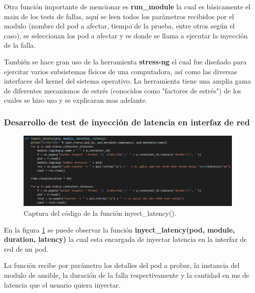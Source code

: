 \par Otra función importante de mencionar es \textbf{run\_module} la cual es básicamente el main de los tests de fallas, aquí se leen todos los parámetros recibidos por el modulo (nombre del pod a afectar, tiempo de la prueba, entre otros según el caso), se seleccionan los pod a afectar y es donde se llama a ejecutar la inyección de la falla.\\

\par También se hace gran uso de la herramienta \textbf{stress-ng} 
el cual fue diseñado para ejercitar varios subsistemas físicos de una computadora, así como las diversas interfaces del kernel del sistema operativo. La herramienta tiene una amplia gama de diferentes mecanismos de estrés (conocidos como "factores de estrés") de los cuales se hizo uso y se explicaran mas adelante.\\

\subsubsection{Desarrollo de test de inyección de latencia en interfaz de red}

\begin{figure}[htpb!]
	\centering
	\includegraphics[width=0.95\columnwidth]{images/captures/codigo/Capture_inyect_latency.PNG}
	\caption{Captura del código de la función inyect\_latency().}
	\label{fig:codi02}
\end{figure}

\par En la figura \ref{fig:codi02} se puede observar la función \textbf{ inyect\_latency(pod, module, duration, latency)} la cual esta encargada de inyectar latencia en la interfaz de red de un pod.\\

\par La función recibe por parámetro los detalles del pod a probar, la instancia del modulo de ansible, la duración de la falla respectivamente y la cantidad en ms de latencia que el usuario quiera inyectar. \\

